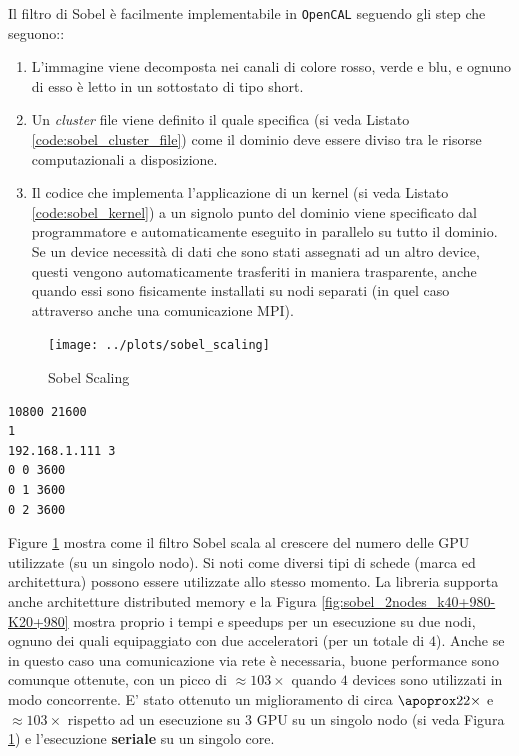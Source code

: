 Il filtro di Sobel è facilmente implementabile in \texttt{OpenCAL} seguendo gli step che seguono::
\begin{enumerate}
	\item L'immagine viene decomposta nei canali di colore rosso, verde e blu, e ognuno di esso è letto in un sottostato di tipo short.
	\item Un \textit{cluster} file viene definito il quale specifica (si veda Listato \ref{code:sobel_cluster_file}) come il dominio deve essere diviso tra le risorse computazionali a disposizione.
	\item Il codice che implementa l'applicazione di un kernel (si veda Listato \ref{code:sobel_kernel}) a un signolo punto del dominio viene specificato dal programmatore e automaticamente eseguito in parallelo su tutto il dominio. Se un device necessità di dati che sono stati assegnati ad un altro device, questi vengono automaticamente trasferiti in maniera trasparente, anche quando essi sono fisicamente installati su nodi separati (in quel caso attraverso anche una comunicazione MPI).
\end{enumerate}
\begin{figure}
	\centering
	\caption{Sobel Scaling}
	\label{fig:sobel_scaling}
	\texttt{[image: ../plots/sobel\_scaling]}
\end{figure}
\begin{lstlisting}[float]
10800 21600
1
192.168.1.111 3
0 0 3600
0 1 3600
0 2 3600
\end{lstlisting}
Figure \ref{fig:sobel_scaling} mostra  come il filtro Sobel scala al crescere del numero delle GPU utilizzate (su un singolo nodo). Si noti come diversi tipi di schede (marca ed architettura) possono essere utilizzate allo stesso momento.
La libreria supporta anche architetture distributed memory e la Figura \ref{fig:sobel_2nodes_k40+980-K20+980} mostra proprio i tempi e speedups per un esecuzione su due nodi, ognuno dei quali equipaggiato con due acceleratori (per un totale di $4$). Anche se in questo caso una comunicazione via rete è necessaria, buone performance sono comunque ottenute, con un picco di $\approx 103\times$ quando $4$ devices sono utilizzati in modo concorrente.
E' stato ottenuto un miglioramento di circa $\apoprox 22 \times$ e $\approx 103 \times $ rispetto ad un esecuzione su $3$ GPU su un singolo nodo (si veda Figura \ref{fig:sobel_scaling}) e l'esecuzione \textbf{seriale} su un singolo core.
